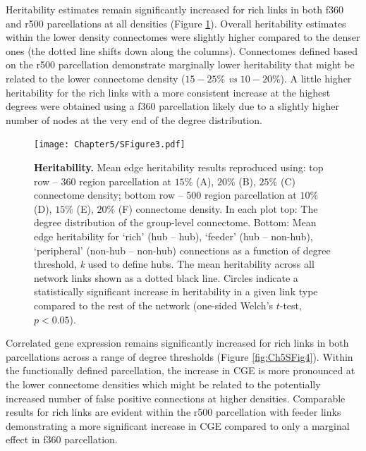 \clearpage
Heritability estimates remain significantly increased for rich links in both f360 and r500 parcellations at all densities (Figure \ref{fig:Ch5SFig3}). Overall heritability estimates within the lower density connectomes were slightly higher compared to the denser ones (the dotted line shifts down along the columns). Connectomes defined based on the r500 parcellation demonstrate marginally lower heritability that might be related to the lower connectome density ($15-25\%$ \textit{vs} $10-20\%$). A little higher heritability for the rich links with a more consistent increase at the highest degrees were obtained using a f360 parcellation likely due to a slightly higher number of nodes at the very end of the degree distribution.

\begin{figure}[h!]
\begin{center}
\texttt{[image: Chapter5/SFigure3.pdf]}%
\end{center}
\caption{\textbf{Heritability.}
Mean edge heritability results reproduced using: top row -- 360 region parcellation at $15\%$ (A), $20\%$ (B), $25\%$ (C) connectome density; bottom row -- 500 region parcellation at $10\%$ (D), $15\%$ (E), $20\%$ (F) connectome density. In each plot top: The degree distribution of the group-level connectome. Bottom: Mean edge heritability for `rich' (hub -- hub), `feeder' (hub -- non-hub), `peripheral' (non-hub -- non-hub) connections as a function of degree threshold, \textit{k} used to define hubs. The mean heritability across all network links shown as a dotted black line. Circles indicate a statistically significant increase in heritability in a given link type compared to the rest of the network (one-sided Welch's $t$-test, $p < 0.05$).}
\label{fig:Ch5SFig3}
\end{figure}

\clearpage
Correlated gene expression remains significantly increased for rich links in both parcellations across a range of degree thresholds (Figure \ref{fig:Ch5SFig4}). Within the functionally defined parcellation, the increase in CGE is more pronounced at the lower connectome densities which might be related to the potentially increased number of false positive connections at higher densities. Comparable results for rich links are evident within the r500 parcellation with feeder links demonstrating a more significant increase in CGE compared to only a marginal effect in f360 parcellation.

